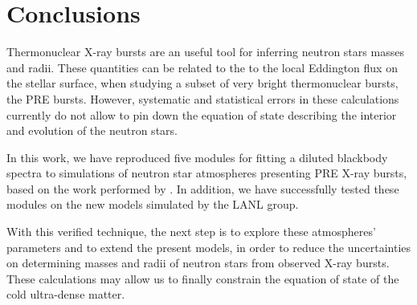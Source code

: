 \section{Conclusions}


Thermonuclear X-ray bursts are an useful tool for inferring neutron stars masses and radii. These quantities can be related to the to the local Eddington flux on the stellar surface, when studying a subset of very bright thermonuclear bursts, the PRE bursts. However, systematic and statistical errors in these calculations currently do not allow to pin down the equation of state describing the interior and evolution of the neutron stars.

\quad

In this work,  we have reproduced five modules for fitting a diluted blackbody spectra to simulations of neutron star atmospheres presenting PRE X-ray bursts, based on the work performed by \cite{SPW10}. In addition, we have successfully tested these modules on the new models simulated by the LANL group.

\quad

With this verified technique, the next step is to explore these atmospheres' parameters and to extend the present models, in order to reduce the uncertainties on determining masses and radii of neutron stars from observed X-ray bursts. These calculations may allow us to finally constrain the equation of state of the cold ultra-dense matter. 
